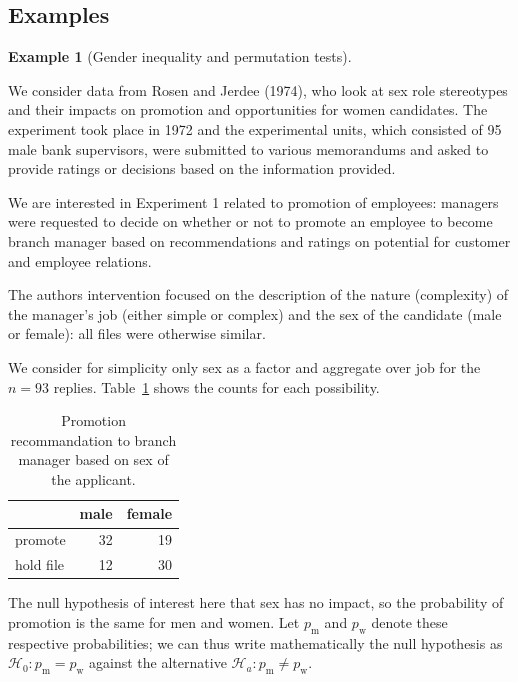 \documentclass[
  11pt,
  letterpaper,
]{scrbook}
\theoremstyle{definition}
\theoremstyle{definition}
\newtheorem{example}{Example}[chapter]
\theoremstyle{remark}
\begin{document}
\subsection{Examples}\label{examples}

\begin{example}[Gender inequality and permutation
tests]\protect\hypertarget{exm-rosenjerdee74}{}\label{exm-rosenjerdee74}

We consider data from Rosen and Jerdee (1974), who look at sex role
stereotypes and their impacts on promotion and opportunities for women
candidates. The experiment took place in 1972 and the experimental
units, which consisted of 95 male bank supervisors, were submitted to
various memorandums and asked to provide ratings or decisions based on
the information provided.

We are interested in Experiment 1 related to promotion of employees:
managers were requested to decide on whether or not to promote an
employee to become branch manager based on recommendations and ratings
on potential for customer and employee relations.

The authors intervention focused on the description of the nature
(complexity) of the manager's job (either simple or complex) and the sex
of the candidate (male or female): all files were otherwise similar.

We consider for simplicity only sex as a factor and aggregate over job
for the \(n=93\) replies. Table~\ref{tbl-rosen-table1} shows the counts
for each possibility.

\begin{longtable}[t]{lrr}

\caption{\label{tbl-rosen-table1}Promotion recommandation to branch
manager based on sex of the applicant.}

\tabularnewline

\toprule
 & male & female\\
\midrule
promote & 32 & 19\\
hold file & 12 & 30\\
\bottomrule

\end{longtable}

The null hypothesis of interest here that sex has no impact, so the
probability of promotion is the same for men and women. Let
\(p_{\text{m}}\) and \(p_{\text{w}}\) denote these respective
probabilities; we can thus write mathematically the null hypothesis as
\(\mathscr{H}_0: p_{\text{m}} = p_{\text{w}}\) against the alternative
\(\mathscr{H}_a: p_{\text{m}} \neq p_{\text{w}}\).


\end{example}
\end{document}
